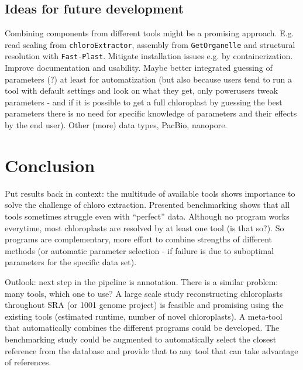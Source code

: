 \documentclass{bmcart}
\newcommand{\formatprogramnames}[1]{\texttt{#1}}
\newcommand{\ce}{\formatprogramnames{chloroExtractor}}
\newcommand{\fp}{\formatprogramnames{Fast-Plast}}
\newcommand{\go}{\formatprogramnames{GetOrganelle}}
\begin{document}
\subsection*{Ideas for future development}
Combining components from different tools might be a promising approach. E.g. read scaling from \ce{}, assembly from \go{} and structural resolution with \fp{}.
Mitigate installation issues e.g. by containerization.
Improve documentation and usability.
Maybe better integrated guessing of parameters (?) at least for automatization (but also because users tend to run a tool with default settings and look on what they get, only powerusers tweak parameters - and if it is possible to get a full chloroplast by guessing the best parameters there is no need for specific knowledge of parameters and their effects by the end user).
Other (more) data types, PacBio, nanopore.

\section*{Conclusion}

Put results back in context: the multitude of available tools shows importance to solve the challenge of chloro extraction. Presented benchmarking shows that all tools sometimes struggle even with ``perfect'' data. Although no program works everytime, most chloroplasts are resolved by at least one tool (is that so?). So programs are complementary, more effort to combine strengths of different methods (or automatic parameter selection - if failure is due to suboptimal parameters for the specific data set).

Outlook: next step in the pipeline is annotation. There is a similar problem: many tools, which one to use? 
A large scale study reconstructing chloroplasts throughout SRA (or \num{1001} genome project) is feasible and promising using the existing tools (estimated runtime, number of novel chloroplasts).
A meta-tool that automatically combines the different programs could be developed.
The benchmarking study could be augmented to automatically select the closest reference from the database and provide that to any tool that can take advantage of references.

\end{document}

